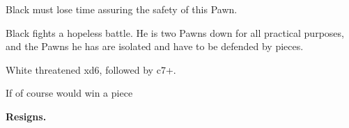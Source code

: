 \documentclass[10pt,twoside]{article}
\begin{document}

Black must lose time assuring the safety of this Pawn.


Black fights a hopeless battle. He is two Pawns down for all practical purposes, and the Pawns he has are isolated and have to be defended by pieces.


White threatened \figN xd6, followed by \figR c7+.


If  of course would win a piece


\noindent\textbf{Resigns.}
\end{document}
